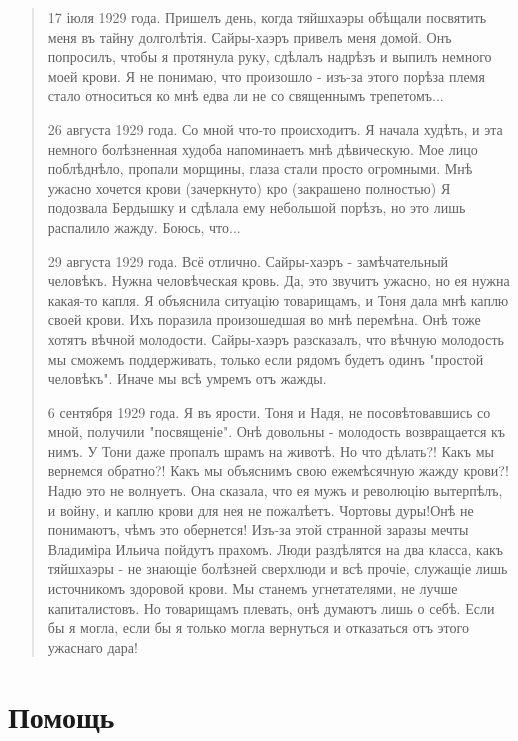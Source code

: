 \begin{quote}

{\ttfamily \small 17 іюля 1929 года.
Пришелъ день, когда тяйшхаэры обѣщали посвятить меня въ тайну долголѣтія.
Сайры-​хаэръ​ привелъ меня домой.
Онъ попросилъ, чтобы я протянула руку, сдѣлалъ надрѣзъ и выпилъ немного моей крови.
Я не понимаю, что произошло - изъ-за этого порѣза племя стало относиться ко мнѣ едва ли не со священнымъ трепетомъ...}

{\ttfamily \small 26 августа 1929 года.
Со мной что-то происходитъ.
Я начала худѣть, и эта немного болѣзненная худоба напоминаетъ мнѣ дѣвическую.
Мое лицо поблѣднѣло, пропали морщины, глаза стали просто огромными.
Мнѣ ужасно хочется крови} (зачеркнуто) {\ttfamily \small ​кро​} (закрашено полностью)
{\ttfamily \small Я подозвала ​Бердышку​ и сдѣлала ему небольшой порѣзъ, но это лишь распалило жажду.
Боюсь, что...}

{\ttfamily \small 29 августа 1929 года.
Всё отлично.
Сайры-​хаэръ​ - замѣчательный человѣкъ.
Нужна человѣческая кровь.
Да, это звучитъ ужасно, но ​ея​ нужна какая-то капля.
Я объяснила ситуацію товарищамъ, и Тоня дала мнѣ каплю своей крови.
Ихъ поразила произошедшая во мнѣ перемѣна. 
​Онѣ​ тоже хотятъ вѣчной молодости.
Сайры-​хаэръ​ разсказалъ, что вѣчную молодость мы сможемъ поддерживать, только если рядомъ будетъ одинъ "простой человѣкъ".
Иначе мы ​всѣ​ умремъ отъ жажды.}

{\ttfamily \small 6 сентября 1929 года.
Я въ ярости.
Тоня и Надя, не посовѣтовавшись со мной, получили "посвященіе".
​Онѣ​ довольны - молодость возвращается къ нимъ.
У Тони даже пропалъ шрамъ на животѣ.
Но что дѣлать?!
Какъ мы вернемся обратно?!
Какъ мы объяснимъ свою ежемѣсячную жажду крови?!
Надю это не волнуетъ.
Она сказала, что ​ея​ мужъ и революцію вытерпѣлъ, и войну, и каплю крови для ​нея​ не пожалѣетъ.
​Чортовы​ дуры!
​Онѣ​ не понимаютъ, ​чѣмъ​ это обернется!
Изъ-за этой странной заразы мечты Владиміра Ильича пойдутъ прахомъ.
Люди раздѣлятся на два класса, какъ тяйшхаэры - не ​знающіе​ болѣзней сверхлюди и ​всѣ​ ​прочіе​, ​служащіе​ лишь источникомъ здоровой крови.
Мы станемъ угнетателями, не лучше капиталистовъ.
Но товарищамъ плевать, ​онѣ​ думаютъ лишь о себѣ.
Если бы я могла, если бы я только могла вернуться и отказаться отъ этого ужаснаго дара!}                                                                                          \end{quote} 

\section{Помощь}

